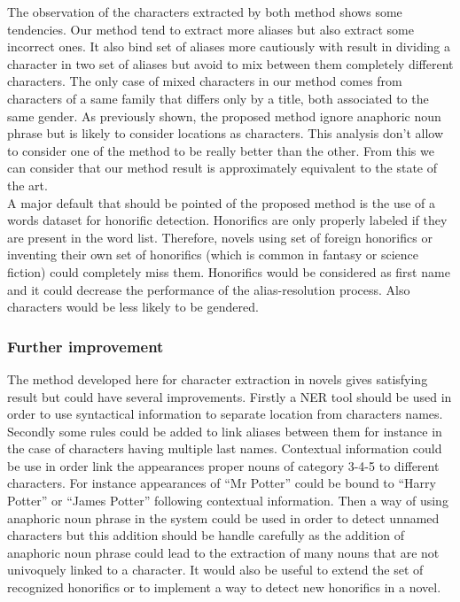 \documentclass[a4paper, 12pt]{report}
\begin{document}
The observation of the characters extracted by both method shows some tendencies. Our method tend to extract more aliases but also extract some incorrect ones. It also bind set of aliases more cautiously with result in dividing a character in two set of aliases but avoid to mix between them completely different characters. The only case of mixed characters in our method comes from characters of a same family that differs only by a title, both associated to the same gender. As previously shown, the proposed method ignore anaphoric noun phrase but is likely to consider locations as characters. This analysis don't allow to consider one of the method to be really better than the other. From this we can consider that our method result is approximately equivalent to the state of the art. \\

A major default that should be pointed of the proposed method is the use of a words dataset for honorific detection. Honorifics are only properly labeled if they are present in the word list. Therefore, novels using set of foreign honorifics or inventing their own set of honorifics (which is common in fantasy or science fiction) could completely miss them. Honorifics would be considered as first name and it could decrease the performance of the alias-resolution process. Also characters would be less likely to be gendered. \\

\subsubsection{Further improvement}
The method developed here for character extraction in novels gives satisfying result but could have several improvements. Firstly a NER tool should be used in order to use syntactical information to separate location from characters names. Secondly some rules could be added to link aliases between them for instance in the case of characters having multiple last names. Contextual information could be use in order link the appearances proper nouns of category 3-4-5 to different characters. For instance appearances of ``Mr Potter'' could be bound to ``Harry Potter'' or ``James Potter'' following contextual information. Then a way of using anaphoric noun phrase in the system could be used in order to detect unnamed characters but this addition should be handle carefully as the addition of anaphoric noun phrase could lead to the extraction of many nouns that are not univoquely linked to a character. It would also be useful to extend the set of recognized honorifics or to implement a way to detect new honorifics in a novel.\\
\end{document}
